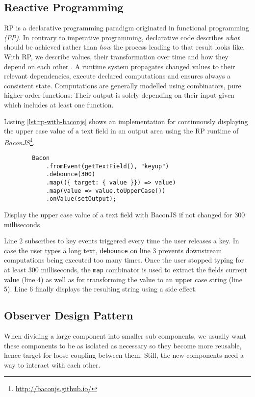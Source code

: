 \documentclass[12pt,a4paper]{article}
\begin{document}
\subsection{Reactive Programming}
RP is a declarative programming paradigm originated in functional programming \emph{(FP)}. In contrary to imperative programming, declarative code describes \emph{what} should be achieved rather than \emph{how} the process leading to that result looks like. With RP, we describe values, their transformation over time and how they depend on each other \cite{8354906}. A runtime system propagates changed values to their relevant dependencies, execute declared computations and ensures always a consistent state. Computations are generally modelled using combinators, pure higher-order functions: Their output is solely depending on their input given which includes at least one function.

Listing \ref{lst:rp-with-baconjs} shows an implementation for continuously displaying the upper case value of a text field in an output area using the RP runtime of \emph{BaconJS}\footnote{\url{http://baconjs.github.io/}}.

\begin{listing}[H]
	\begin{verbatim}
		Bacon
			.fromEvent(getTextField(), "keyup")
			.debounce(300)
			.map(({ target: { value }}) => value)
			.map(value => value.toUpperCase())
			.onValue(setOutput);
	\end{verbatim}
	\caption{Display the upper case value of a text field with BaconJS if not changed for 300 milliseconds}
	\label{lst:rp-with-baconjs}
\end{listing}

Line 2 subscribes to key events triggered every time the user releases a key. In case the user types a long text, \texttt{debounce} on line 3 prevents downstream computations being executed too many times. Once the user stopped typing for at least 300 milliseconds, the \texttt{map} combinator is used to extract the fields current value (line 4) as well as for transforming the value to an upper case string (line 5). Line 6 finally displays the resulting string using a side effect.

\subsection{Observer Design Pattern}
When dividing a large component into smaller sub components, we usually want these components to be as isolated as necessary so they become more reusable, hence target for loose coupling between them. Still, the new components need a way to interact with each other.
\end{document}
